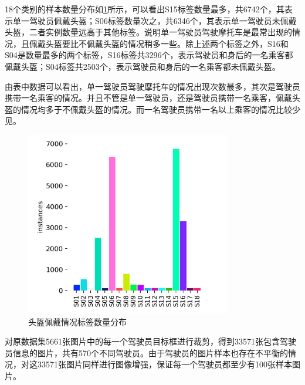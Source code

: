 18个类别的样本数量分布如\ref{fig:label1}所示，可以看出S15标签数量最多，共6742个，其表示单一驾驶员佩戴头盔；S06标签数量次之，共6346个，其表示单一驾驶员未佩戴头盔，二者实例数量远高于其他标签。说明单一驾驶员驾驶摩托车是最常出现的情况，且佩戴头盔要比不佩戴头盔的情况稍多一些。除上述两个标签之外，S16和S04是数量最多的两个标签，S16标签共3296个，表示驾驶员和身后的一名乘客都佩戴头盔；S04标签共2503个，表示驾驶员和身后的一名乘客都未佩戴头盔。

由表中数据可以看出，单一驾驶员驾驶摩托车的情况出现次数最多，其次是驾驶员携带一名乘客的情况。并且不管是单一驾驶员，还是驾驶员携带一名乘客，佩戴头盔的情况均多于不佩戴头盔的情况。而一名驾驶员携带一名以上乘客的情况比较少见。

\begin{figure}[!htb]
    \centering
    \includegraphics[width=0.8\textwidth]{figs/chap03/label1.png}
    \caption{头盔佩戴情况标签数量分布}
    \label{fig:label1}
\end{figure}

对原数据集5661张图片中的每一个驾驶员目标框进行裁剪，得到33571张包含驾驶员信息的图片，共有570个不同驾驶员。由于驾驶员的图片样本也存在不平衡的情况，对这33571张图片同样进行图像增强，保证每一个驾驶员都至少有100张样本图片。


